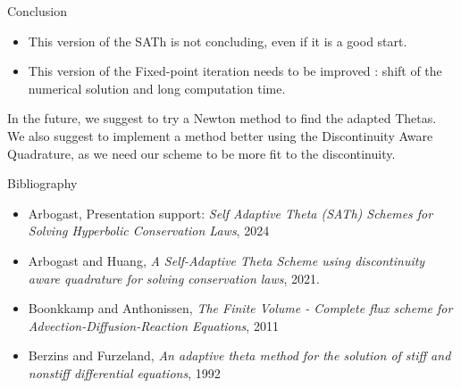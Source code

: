 \documentclass[10pt]{beamer}
\begin{document}
\begin{frame}{Conclusion}
        \begin{itemize}
            \item This version of the SATh is not concluding, even if it is a good start.
            \item This version of the Fixed-point iteration needs to be improved : shift of the numerical solution and long computation time.
        \end{itemize}
        In the future, we suggest to try a Newton method to find the adapted Thetas. We also suggest to implement a method better using the Discontinuity Aware Quadrature, as we need our scheme to be more fit to the discontinuity.

\end{frame}

\begin{frame}{Bibliography}
\begin{itemize}
    \item Arbogast, Presentation support: \textit{Self Adaptive Theta (SATh) Schemes for Solving Hyperbolic Conservation Laws}, 2024
    \item Arbogast and Huang, \textit{A Self-Adaptive Theta Scheme using discontinuity aware quadrature for solving conservation laws}, 2021.
    \item Boonkkamp and Anthonissen, \textit{The Finite Volume - Complete flux scheme for Advection-Diffusion-Reaction Equations}, 2011
    \item Berzins and Furzeland, \textit{An adaptive theta method for the solution of stiff and nonstiff differential equations}, 1992
\end{itemize}
\end{frame}
\end{document}
